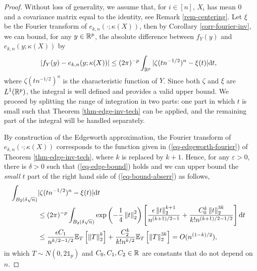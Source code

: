 \begin{proof}
    Without loss of generality, we assume that, for $i \in [n]$, $X_i$ has mean 0 and a covariance matrix equal to the identity, see Remark \ref{rem-centering}. Let $\xi$ be the Fourier transform of $e_{k, n}(\cdot; \kappa(X))$, then by Corollary \ref{corr-fourier-inv}, we can bound, for any $y \in \Rp$, the absolute difference between $f_Y(y)$ and $e_{k, n}(y; \kappa(X))$ by
    \begin{equation} \label{eq-bound-abserr}
        |f_Y(y) - e_{k, n}(y; \kappa(X))| \leq (2\pi)^{-p}\intRp{t}{|\zeta(tn^{-1/2})^n - \xi(t)|},
    \end{equation}
    where $\zeta(tn^{-1/2})^n$ is the characteristic function of $Y$. Since both $\zeta$ and $\xi$ are $L^1(\Rp)$, the integral is well defined and provides a valid upper bound. We proceed by splitting the range of integration in two parts: one part in which $t$ is small such that Theorem \ref{thm-edge-inv-tech} can be applied, and the remaining part of the integral will be handled separately.

    By construction of the Edgeworth approximation, the Fourier transform of $e_{k, n}(\cdot; \kappa(X))$ corresponds to the function given in (\ref{eq-edgeworth-fourier}) of Theorem \ref{thm-edge-inv-tech}, where $k$ is replaced by $k+1$. Hence, for any $\varepsilon > 0$, there is $\delta > 0$ such that (\ref{eq-edge-bound}) holds and we can upper bound the \textit{small $t$} part of the right hand side of (\ref{eq-bound-abserr}) as follows,
    \begin{align*}
        \int_{B_2(\delta\sqrt{n})} &|\zeta(tn^{-1/2})^n - \xi(t)| \d t\\
        &\leq (2\pi)^{-p}\int_{B_2(\delta\sqrt{n})}\expf{-\frac{1}{4}\norm{t}_2^2}\left[ \frac{\epsilon\norm{t}_2^{k+1}}{n^{(k+1)/2-1}} + \frac{C_0^{k}\norm{t}_2^{3k}}{k!n^{(k+1)/2-1/2}} \right] \d t \\
        &\leq \frac{\epsilon C_1}{n^{k/2-1/2}}\expec{T}{\norm{T}^k_2} + \frac{C_2^{k}}{k!n^{k/2}}\expec{T}{\norm{T}_2^{3k}}
        = O(n^{(1-k)/2}),
    \end{align*}
    in which $T \sim N(0, 2\mathbb{1}_p)$ and $C_0, C_1, C_2 \in \R$ are constants that do not depend on $n$. 


\end{proof}
